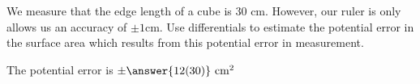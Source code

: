 \documentclass{ximera}
\author{Steven Gubkin}
\begin{document}
\begin{exercise}
We measure that the edge length of a cube is $30 \textrm{ cm}$.
However, our ruler is only allows us an accuracy of $\pm 1 \textrm{
  cm}$.  Use differentials to estimate the potential error in the
surface area which results from this potential error in measurement.

\begin{prompt}
	The potential error is $\pm \answer{12(30)} \textrm{ cm}^2$ 
\end{prompt}

\end{exercise}
\end{document}
